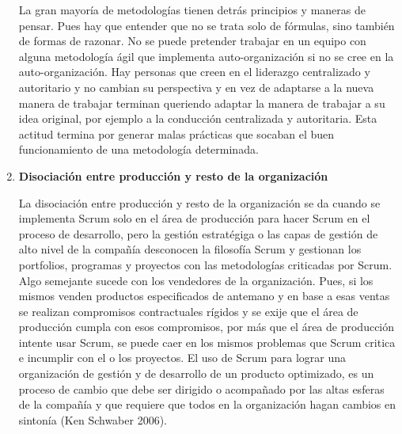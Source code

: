 \begin{enumerate}
La gran mayoría de metodologías tienen detrás principios y maneras de pensar. Pues hay que entender que no se trata solo de fórmulas, sino también de formas de razonar. No se puede pretender trabajar en un equipo con alguna metodología ágil que implementa auto-organización si no se cree en la auto-organización. Hay personas que creen en el liderazgo centralizado y autoritario y no cambian su perspectiva y en vez de adaptarse a la nueva manera de trabajar terminan queriendo adaptar la manera de trabajar a su idea original, por ejemplo a la conducción centralizada y autoritaria. Esta actitud termina por generar malas prácticas que socaban el buen funcionamiento de una metodología determinada.

\item \textbf{Disociación entre producción y resto de la organización}

La disociación entre producción y resto de la organización se da cuando se implementa Scrum solo en el área de producción para hacer Scrum en el proceso de desarrollo, pero la gestión estratégiga o las capas de gestión de alto nivel de la compañía desconocen la filosofía Scrum y gestionan los portfolios, programas y proyectos con las metodologías criticadas por Scrum. Algo semejante sucede con los vendedores de la organización. Pues, si los mismos venden productos especificados de antemano y en base a esas ventas se realizan compromisos contractuales rígidos y se exije que el área de producción cumpla con esos compromisos, por más que el área de producción intente usar Scrum, se puede caer en los mismos problemas que Scrum critica e incumplir con el o los proyectos. El uso de Scrum para lograr una organización de gestión y de desarrollo de un producto optimizado, es un proceso de cambio que debe ser dirigido o acompañado por las altas esferas de la compañía y que requiere que todos en la organización hagan cambios en sintonía (Ken Schwaber 2006).


\end{enumerate}

